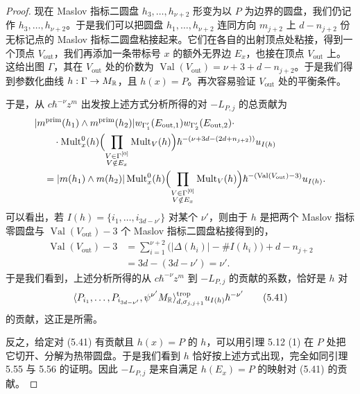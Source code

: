\begin{proof}
现在 Maslov 指标二圆盘 $h_3,\ldots,h_{\nu+2}$ 形变为以 $P$ 为边界的圆盘，我们仍记作 $h_3,\ldots,h_{\nu+2}$。于是我们可以把圆盘 $h_1,\ldots,h_{\nu+2}$ 连同方向 $m_{j+2}$ 上 $d-n_{j+2}$ 份无标记点的 Maslov 指标二圆盘粘接起来。它们在各自的出射顶点处粘接，得到一个顶点 $V_{\mathrm{out}}$，我们再添加一条带标号 $x$ 的额外无界边 $E_x$，也接在顶点 $V_{\mathrm{out}}$ 上。这给出图 $\Gamma$，其在 $V_{\mathrm{out}}$ 处的价数为 $\operatorname{Val}(V_{\mathrm{out}})=\nu+3+d-n_{j+2}$。于是我们得到参数化曲线 $h:\Gamma\to M_{\mathbb{R}}$，且 $h(x)=P$。再次容易验证 $V_{\mathrm{out}}$ 处的平衡条件。

于是，从 $c\hbar^{-\nu}z^m$ 出发按上述方式分析所得的对 $-L_{P,j}$ 的总贡献为
\[
  \begin{aligned}
    &|m^{\mathrm{prim}}(h_1)\wedge m^{\mathrm{prim}}(h_2)|w_{\Gamma'_1}(E_{\mathrm{out},1})w_{\Gamma'_2}(E_{\mathrm{out},2})\cdot\\
    &\qquad\cdot\operatorname{Mult}^0_x(h)\Bigl(\prod_{\substack{V\in\Gamma^{[0]}\\ V\notin E_x}}\operatorname{Mult}_V(h)\Bigr)
      \hbar^{-(\nu+3d-(2d+n_{j+2}))}u_{I(h)}\\
    &\quad=|m(h_1)\wedge m(h_2)|\operatorname{Mult}^0_x(h)
      \Bigl(\prod_{\substack{V\in\Gamma^{[0]}\\ V\notin E_x}}\operatorname{Mult}_V(h)\Bigr)
      \hbar^{-(\operatorname{Val}(V_{\mathrm{out}})-3)}u_{I(h)}.
  \end{aligned}
\]
可以看出，若 $I(h)=\{i_1,\ldots,i_{3d-\nu'}\}$ 对某个 $\nu'$，则由于 $h$ 是把两个 Maslov 指标零圆盘与 $\operatorname{Val}(V_{\mathrm{out}})-3$ 个 Maslov 指标二圆盘粘接得到的，
\[
  \begin{aligned}
    \operatorname{Val}(V_{\mathrm{out}})-3
    &=\sum_{i=1}^{\nu+2}\bigl(|\Delta(h_i)|-\#I(h_i)\bigr)+d-n_{j+2}\\
    &=3d-(3d-\nu')=\nu'.
  \end{aligned}
\]
于是我们看到，上述分析所得的从 $c\hbar^{-\nu}z^m$ 到 $-L_{P,j}$ 的贡献的系数，恰好是 $h$ 对
\begin{equation}
  \langle P_{i_1},\ldots,P_{i_{3d-\nu'}},\psi^{\nu'}M_{\mathbb{R}}\rangle^{\mathrm{trop}}_{d,\sigma_{j,j+1}}u_{I(h)}\hbar^{-\nu'} \tag{5.41}
\end{equation}
的贡献，这正是所需。

反之，给定对 (5.41) 有贡献且 $h(x)=P$ 的 $h$，可以用引理 5.12 (1) 在 $P$ 处把它切开、分解为热带圆盘。于是我们看到 $h$ 恰好按上述方式出现，完全如同引理 5.55 与 5.56 的证明。因此 $-L_{P,j}$ 是来自满足 $h(E_x)=P$ 的映射对 (5.41) 的贡献。
\end{proof}

